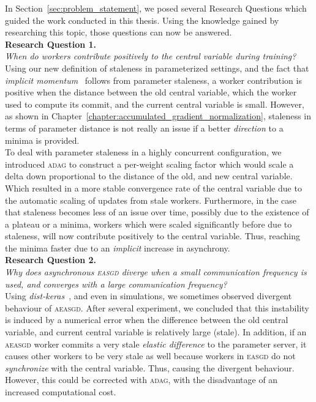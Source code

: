 In Section~\ref{sec:problem_statement}, we posed several Research Questions which guided the work conducted in this thesis. Using the knowledge gained by researching this topic, those questions can now be answered.\\

\noindent \textbf{Research Question 1.}\\
\emph{When do workers contribute positively to the central variable during training?}\\

Using our new definition of staleness in parameterized settings, and the fact that \emph{implicit momentum}~\cite{implicitmomentum} follows from parameter staleness, a worker contribution is positive when the distance between the old central variable, which the worker used to compute its commit, and the current central variable is small. However, as shown in Chapter~\ref{chapter:accumulated_gradient_normalization}, staleness in terms of parameter distance is not really an issue if a better \emph{direction} to a minima is provided.\\

To deal with parameter staleness in a highly concurrent configuration, we introduced \textsc{adag} to construct a per-weight scaling factor which would scale a delta down proportional to the distance of the old, and new central variable. Which resulted in a more stable convergence rate of the central variable due to the automatic scaling of updates from stale workers. Furthermore, in the case that staleness becomes less of an issue over time, possibly due to the existence of a plateau or a minima, workers which were scaled significantly before due to staleness, will now contribute positively to the central variable. Thus, reaching the minima faster due to an \emph{implicit} increase in asynchrony.\\

\noindent \textbf{Research Question 2.}\\
\emph{Why does asynchronous \textsc{easgd} diverge when a small communication frequency is used, and converges with a large communication frequency?}\\

Using \emph{dist-keras}~\cite{dist_keras}, and even in simulations, we sometimes observed divergent behaviour of \textsc{aeasgd}. After several experiment, we concluded that this instability is induced by a numerical error when the difference between the old central variable, and current central variable is relatively large (stale). In addition, if an \textsc{aeasgd} worker commits a very stale \emph{elastic difference} to the parameter server, it causes other workers to be very stale as well because workers in \textsc{easgd} do not \emph{synchronize} with the central variable. Thus, causing the divergent behaviour. However, this could be corrected with \textsc{adag}, with the disadvantage of an increased computational cost.\\

